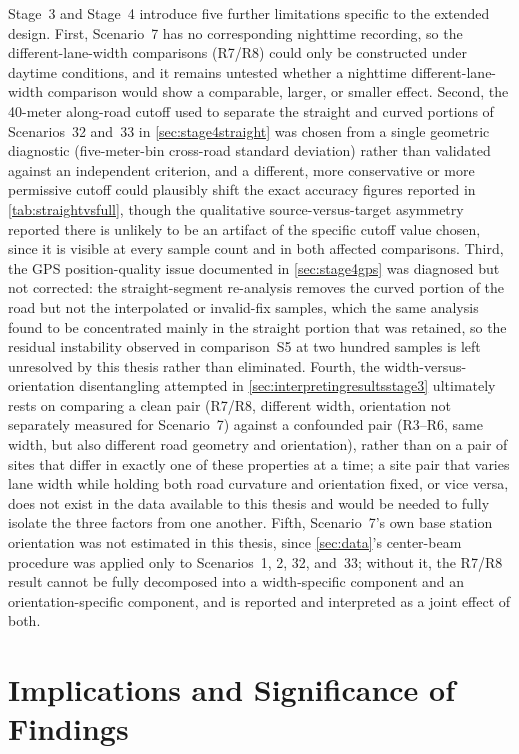 \documentclass{iutbscthesis}
\begin{document}
Stage~3 and Stage~4 introduce five further limitations specific to the extended design. First, Scenario~7 has no corresponding nighttime recording, so the different-lane-width comparisons (R7/R8) could only be constructed under daytime conditions, and it remains untested whether a nighttime different-lane-width comparison would show a comparable, larger, or smaller effect. Second, the 40-meter along-road cutoff used to separate the straight and curved portions of Scenarios~32 and~33 in \autoref{sec:stage4straight} was chosen from a single geometric diagnostic (five-meter-bin cross-road standard deviation) rather than validated against an independent criterion, and a different, more conservative or more permissive cutoff could plausibly shift the exact accuracy figures reported in \autoref{tab:straightvsfull}, though the qualitative source-versus-target asymmetry reported there is unlikely to be an artifact of the specific cutoff value chosen, since it is visible at every sample count and in both affected comparisons. Third, the GPS position-quality issue documented in \autoref{sec:stage4gps} was diagnosed but not corrected: the straight-segment re-analysis removes the curved portion of the road but not the interpolated or invalid-fix samples, which the same analysis found to be concentrated mainly in the straight portion that was retained, so the residual instability observed in comparison~S5 at two hundred samples is left unresolved by this thesis rather than eliminated. Fourth, the width-versus-orientation disentangling attempted in \autoref{sec:interpretingresultsstage3} ultimately rests on comparing a clean pair (R7/R8, different width, orientation not separately measured for Scenario~7) against a confounded pair (R3--R6, same width, but also different road geometry and orientation), rather than on a pair of sites that differ in exactly one of these properties at a time; a site pair that varies lane width while holding both road curvature and orientation fixed, or vice versa, does not exist in the data available to this thesis and would be needed to fully isolate the three factors from one another. Fifth, Scenario~7's own base station orientation was not estimated in this thesis, since \autoref{sec:data}'s center-beam procedure was applied only to Scenarios~1, 2, 32, and~33; without it, the R7/R8 result cannot be fully decomposed into a width-specific component and an orientation-specific component, and is reported and interpreted as a joint effect of both.

\section{Implications and Significance of Findings}
\label{sec:implications}
\end{document}
